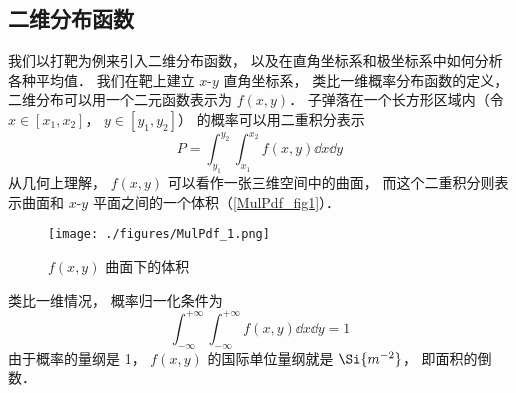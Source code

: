 


\subsection{二维分布函数}
我们以打靶为例来引入二维分布函数， 以及在直角坐标系和极坐标系中如何分析各种平均值． 我们在靶上建立 $x$-$y$ 直角坐标系， 类比一维概率分布函数的定义， 二维分布可以用一个二元函数表示为 $f(x, y)$． 子弹落在一个长方形区域内（令 $x \in [x_1, x_2]$， $y \in [y_1, y_2]$） 的概率可以用二重积分表示
\begin{equation}
P = \int_{y_1}^{y_2} \int_{x_1}^{x_2} f(x, y) \dd{x} \dd{y}
\end{equation}
从几何上理解， $f(x, y)$ 可以看作一张三维空间中的曲面， 而这个二重积分则表示曲面和 $x$-$y$ 平面之间的一个体积（\autoref{MulPdf_fig1}）．

\begin{figure}[ht]
\centering
\texttt{[image: ./figures/MulPdf\_1.png]}
\caption{$f(x, y)$ 曲面下的体积} \label{MulPdf_fig1}
\end{figure}

类比一维情况， 概率归一化条件为
\begin{equation}
\int_{-\infty}^{+\infty} \int_{-\infty}^{+\infty} f(x, y) \dd{x} \dd{y} = 1
\end{equation}
由于概率的量纲是 1， $f(x, y)$ 的国际单位量纲就是 $\Si{m^{-2}}$， 即面积的倒数．

